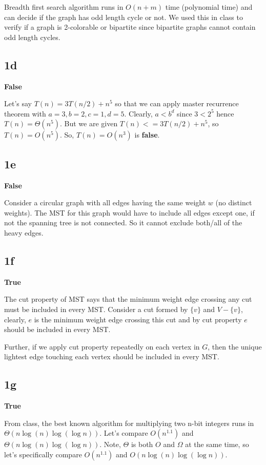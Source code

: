 \documentclass{article}
\begin{document}
    Breadth first search algorithm runs in $O(n+m)$ time (polynomial time) and can decide if the graph has odd length cycle or not. We used this in class to verify if a graph is 2-colorable or bipartite since bipartite graphs cannot contain odd length cycles.

    \subsection*{1d}
    \textbf{False}

    Let's say $T(n) = 3T(n/2) + n^5$ so that we can apply master recurrence theorem with $a = 3, b = 2, c = 1, d = 5$. Clearly, $a < b^d$ since $3 < 2^5$ hence $T(n) = \Theta(n^5)$. But we are given $T(n) <= 3T(n/2) + n^5$, so $T(n) = O(n^5)$. So, $T(n) = O(n^3)$ is \textbf{false}.

    \subsection*{1e}
    \textbf{False}

    Consider a circular graph with all edges having the same weight $w$ (no distinct weights). The MST for this graph would have to include all edges except one, if not the spanning tree is not connected. So it cannot exclude both/all of the heavy edges.

    \subsection*{1f}
    \textbf{True}

    The cut property of MST says that the minimum weight edge crossing any cut must be included in every MST. Consider a cut formed by $\{v\}$ and $V-\{v\}$, clearly, $e$ is the minimum weight edge crossing this cut and by cut property $e$ should be included in every MST.
    
    Further, if we apply cut property repeatedly on each vertex in $G$, then the unique lightest edge touching each vertex should be included in every MST.

    \subsection*{1g}
    \textbf{True}

    From class, the best known algorithm for multiplying two n-bit integers runs in $\Theta(n \log(n) \log(\log n))$. Let's compare $O(n^{1.1})$ and $\Theta(n \log(n) \log(\log n))$. Note, $\Theta$ is both $O$ and $\Omega$ at the same time, so let's specifically compare $O(n^{1.1})$ and $O(n \log(n) \log(\log n))$.
\end{document}
